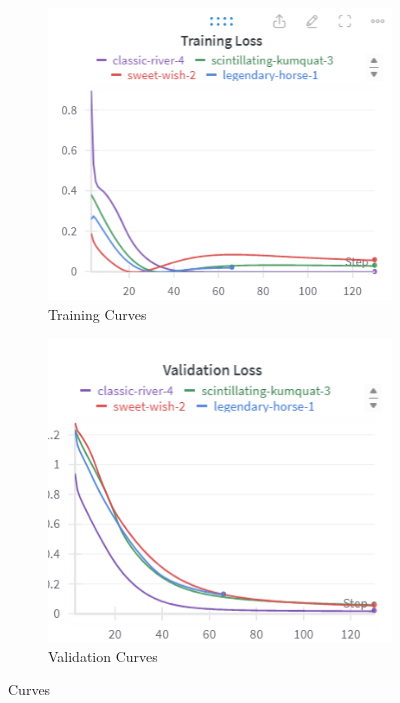 \documentclass[12pt]{article}
\begin{document}
\begin{figure}[h]
    \centering
    \begin{subfigure}{0.6\textwidth}
      \centering
      \includegraphics[width=0.9\linewidth]{Training 3.png}
      \caption{Training Curves}
      \label{fig:TC}
    \end{subfigure}
    \hfill
    \begin{subfigure}{0.6\textwidth}
      \centering
      \includegraphics[width=0.9\linewidth]{Validation3.png}
      \caption{Validation Curves}
      \label{fig:vC}
    \end{subfigure}
    \caption{Curves}
    \label{fig:combined5}
\end{figure}
\end{document}
